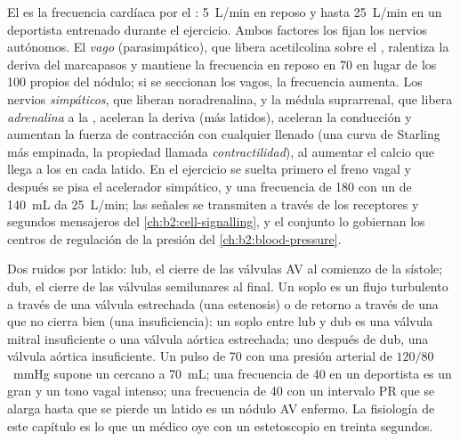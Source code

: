 \begin{proposition}\label{prop:b2:heart:control}
El  es la frecuencia cardíaca por el :
\qty{5}{L/min} en reposo y hasta \qty{25}{L/min} en un deportista
entrenado durante el ejercicio. Ambos factores los fijan los nervios
autónomos. El \emph{vago} (parasimpático), que libera acetilcolina sobre
el , ralentiza la deriva del marcapasos y mantiene la
frecuencia en reposo en 70 en lugar de los 100 propios del nódulo; si se
seccionan los vagos, la frecuencia aumenta. Los nervios \emph{simpáticos},
que liberan noradrenalina, y la médula suprarrenal, que libera
\emph{adrenalina} a la , aceleran la deriva (más latidos), aceleran
la conducción y aumentan la fuerza de contracción con cualquier llenado
(una curva de Starling más empinada, la propiedad llamada
\emph{contractilidad}), al aumentar el calcio que llega a los  en
cada latido. En el ejercicio se suelta primero el freno vagal y después se
pisa el acelerador simpático, y una frecuencia de 180 con un  de \qty{140}{mL} da \qty{25}{L/min}; las señales se transmiten a
través de los receptores y segundos mensajeros del
\cref{ch:b2:cell-signalling}, y el conjunto lo gobiernan los centros de
regulación de la presión del \cref{ch:b2:blood-pressure}.
\end{proposition}

\begin{example}\label{ex:b2:heart:reading}
Dos ruidos por latido: lub, el cierre de las válvulas AV al comienzo de la
sístole; dub, el cierre de las válvulas semilunares al final. Un soplo es
un flujo turbulento a través de una válvula estrechada (una estenosis) o
de retorno a través de una que no cierra bien (una insuficiencia): un
soplo entre lub y dub es una válvula mitral insuficiente o una válvula
aórtica estrechada; uno después de dub, una válvula aórtica insuficiente.
Un pulso de 70 con una presión arterial de
$120/80$~mmHg supone un  cercano a \qty{70}{mL};
una frecuencia de 40 en un deportista es un gran  y un
tono vagal intenso; una frecuencia de 40 con un intervalo PR que se alarga
hasta que se pierde un latido es un nódulo AV enfermo. La fisiología de
este capítulo es lo que un médico oye con un estetoscopio en treinta
segundos.
\end{example}

